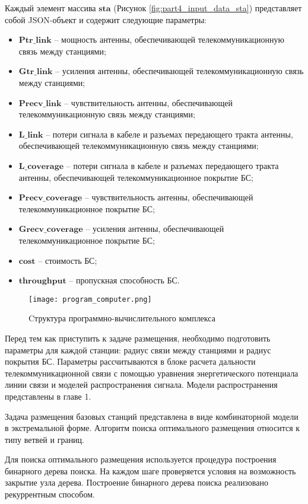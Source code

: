 Каждый элемент массива $\textbf{sta}$ (Рисунок \cref{fig:part4_input_data_sta}) представляет собой JSON-объект и содержит следующие параметры:
\begin{itemize}
  \item $\textbf{Ptr\_link}$ -- мощность антенны, обеспечивающей телекоммуникационную связь между станциями;
  \item $\textbf{Gtr\_link}$ -- усиления антенны, обеспечивающей телекоммуникационную связь между станциями;
  \item $\textbf{Precv\_link}$ -- чувствительность антенны, обеспечивающей телекоммуникационную связь между станциями;
  \item $\textbf{L\_link}$ -- потери сигнала в кабеле и разъемах передающего тракта антенны, обеспечивающей телекоммуникационную связь между станциями;
  \item $\textbf{L\_coverage}$ -- потери сигнала в кабеле и разъемах передающего тракта антенны, обеспечивающей телекоммуникационное покрытие БС;
  \item $\textbf{Precv\_coverage}$ -- чувствительность антенны, обеспечивающей телекоммуникационное покрытие БС;
  \item $\textbf{Grecv\_coverage}$ -- усиления антенны, обеспечивающей телекоммуникационное покрытие БС;
  \item $\textbf{cost}$ -- стоимость БС;
  \item $\textbf{throughput}$ -- пропускная способность БС.
\end{itemize}



\begin{figure}[h!]
  \centering
   \texttt{[image: program\_computer.png]}
\caption{Cтруктура программно-вычислительного комплекса}
\label{fig:part4_program_computer}
\end{figure}

Перед тем как приступить к задаче размещения, необходимо подготовить параметры для каждой станции: радиус связи между станциями и радиус покрытия БС. Параметры рассчитываются в блоке расчета дальности телекоммуникационной связи с помощью уравнения энергетического потенциала линии связи и моделей распространения сигнала. Модели распространения представлены в главе 1.


Задача размещения базовых станций представлена в виде комбинаторной модели в экстремальной форме. Алгоритм поиска оптимального размещения относится к типу ветвей и границ. 

Для поиска оптимального размещения используется процедура построения бинарного дерева поиска. На каждом шаге проверяется условия на возможность закрытие узла дерева. Построение бинарного дерева поиска реализовано рекуррентным способом.

